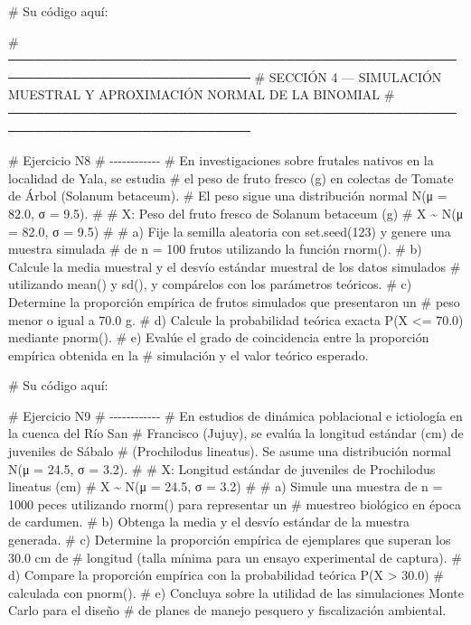 \documentclass[
  spanish,
  letterpaper,
  DIV=11,
  numbers=noendperiod]{scrreprt}
\newenvironment{Shaded}{\begin{snugshade}}{\end{snugshade}}
\newcommand{\CommentTok}[1]{\textcolor[rgb]{0.37,0.37,0.37}{#1}}
\begin{document}
\begin{Shaded}
\begin{Highlighting}[]
\CommentTok{\# Su código aquí:}


\CommentTok{\# ─────────────────────────────────────────────────────────────────────────────}
\CommentTok{\#  SECCIÓN 4 — SIMULACIÓN MUESTRAL Y APROXIMACIÓN NORMAL DE LA BINOMIAL}
\CommentTok{\# ─────────────────────────────────────────────────────────────────────────────}

\CommentTok{\# Ejercicio N8}
\CommentTok{\# {-}{-}{-}{-}{-}{-}{-}{-}{-}{-}{-}{-}}
\CommentTok{\# En investigaciones sobre frutales nativos en la localidad de Yala, se estudia}
\CommentTok{\# el peso de fruto fresco (g) en colectas de Tomate de Árbol (Solanum betaceum).}
\CommentTok{\# El peso sigue una distribución normal N(μ = 82.0, σ = 9.5).}
\CommentTok{\#}
\CommentTok{\#  X: Peso del fruto fresco de Solanum betaceum (g)}
\CommentTok{\#  X \textasciitilde{} N(μ = 82.0, σ = 9.5)}
\CommentTok{\#}
\CommentTok{\# a) Fije la semilla aleatoria con set.seed(123) y genere una muestra simulada}
\CommentTok{\#    de n = 100 frutos utilizando la función rnorm().}
\CommentTok{\# b) Calcule la media muestral y el desvío estándar muestral de los datos simulados}
\CommentTok{\#    utilizando mean() y sd(), y compárelos con los parámetros teóricos.}
\CommentTok{\# c) Determine la proporción empírica de frutos simulados que presentaron un}
\CommentTok{\#    peso menor o igual a 70.0 g.}
\CommentTok{\# d) Calcule la probabilidad teórica exacta P(X \textless{}= 70.0) mediante pnorm().}
\CommentTok{\# e) Evalúe el grado de coincidencia entre la proporción empírica obtenida en la}
\CommentTok{\#    simulación y el valor teórico esperado.}

\CommentTok{\# Su código aquí:}


\CommentTok{\# Ejercicio N9}
\CommentTok{\# {-}{-}{-}{-}{-}{-}{-}{-}{-}{-}{-}{-}}
\CommentTok{\# En estudios de dinámica poblacional e ictiología en la cuenca del Río San}
\CommentTok{\# Francisco (Jujuy), se evalúa la longitud estándar (cm) de juveniles de Sábalo}
\CommentTok{\# (Prochilodus lineatus). Se asume una distribución normal N(μ = 24.5, σ = 3.2).}
\CommentTok{\#}
\CommentTok{\#  X: Longitud estándar de juveniles de Prochilodus lineatus (cm)}
\CommentTok{\#  X \textasciitilde{} N(μ = 24.5, σ = 3.2)}
\CommentTok{\#}
\CommentTok{\# a) Simule una muestra de n = 1000 peces utilizando rnorm() para representar un}
\CommentTok{\#    muestreo biológico en época de cardumen.}
\CommentTok{\# b) Obtenga la media y el desvío estándar de la muestra generada.}
\CommentTok{\# c) Determine la proporción empírica de ejemplares que superan los 30.0 cm de}
\CommentTok{\#    longitud (talla mínima para un ensayo experimental de captura).}
\CommentTok{\# d) Compare la proporción empírica con la probabilidad teórica P(X \textgreater{} 30.0)}
\CommentTok{\#    calculada con pnorm().}
\CommentTok{\# e) Concluya sobre la utilidad de las simulaciones Monte Carlo para el diseño}
\CommentTok{\#    de planes de manejo pesquero y fiscalización ambiental.}


\end{Highlighting}
\end{Shaded}
\end{document}
